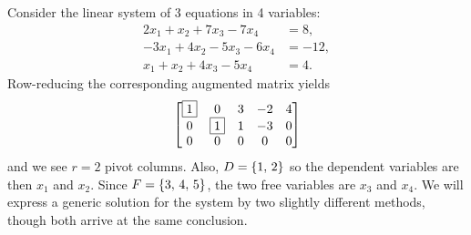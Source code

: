 \documentclass{ximera}
\begin{document}
\begin{example}
  Consider the linear system of 3 equations in 4 variables:
  \begin{align*}
    2x_1  + x_2 + 7x_3 - 7x_4 &= 8, \\
    -3x_1 + 4x_2 -5x_3 - 6x_4 &=  -12, \\
    x_1 +x_2 + 4x_3 - 5x_4 &=  4.
  \end{align*}
  Row-reducing the corresponding augmented matrix yields
  \[
    \begin{bmatrix}
      \fbox{1} & 0 & 3 & -2 & 4 \\
      0 & \fbox{1} & 1 &  -3 & 0\\
      0 & 0 & 0 &  0 & 0
    \end{bmatrix}
  \]
  and we see $r=2$ pivot columns. Also, $D=\left\{1,\,2\right\}$ so the
  dependent variables are then $x_1$ and $x_2$.  Since
  $F=\left\{3,\,4,\,5\right\}$, the two free variables are $x_3$ and $x_4$.  We
  will express a generic solution for the system by two slightly
  different methods, though both arrive at the same conclusion.


\end{example}
\end{document}
